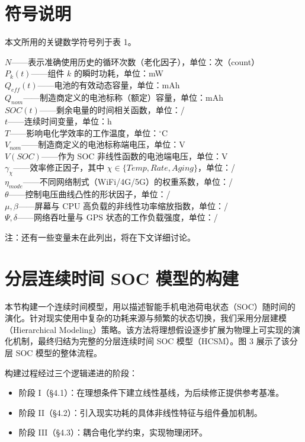 \documentclass[11pt,a4paper]{ctexart}
\begin{document}
\section{符号说明}

本文所用的关键数学符号列于表 1。

\noindent $N$——表示准确使用历史的循环次数（老化因子），单位：次（count）\\
$P_k(t)$——组件 $k$ 的瞬时功耗，单位：mW\\
$Q_{eff}(t)$——电池的有效动态容量，单位：mAh\\
$Q_{nom}$——制造商定义的电池标称（额定）容量，单位：mAh\\
$SOC(t)$——剩余电量的时间相关函数，单位：/\\
$t$——连续时间变量，单位：h\\
$T$——影响电化学效率的工作温度，单位：$^{\circ}$C\\
$V_{nom}$——制造商定义的电池标称端电压，单位：V\\
$V(SOC)$——作为 SOC 非线性函数的电池端电压，单位：V\\
$\gamma_{\chi}$——效率修正因子，其中 $\chi\in\{Temp,Rate,Aging\}$，单位：/\\
$\eta_{mode}$——不同网络制式（WiFi/4G/5G）的权重系数，单位：/\\
$\theta$——控制电压曲线凸性的形状因子，单位：/\\
$\mu,\beta$——屏幕与 CPU 高负载的非线性功率缩放指数，单位：/\\
$\Psi,\delta$——网络吞吐量与 GPS 状态的工作负载强度，单位：/

\noindent*注：还有一些变量未在此列出，将在下文详细讨论。

\section{分层连续时间 SOC 模型的构建}

本节构建一个连续时间模型，用以描述智能手机电池荷电状态（SOC）随时间的演化。针对现实使用中复杂的功耗来源与频繁的状态切换，我们采用分层建模（Hierarchical Modeling）策略。该方法将理想假设逐步扩展为物理上可实现的演化机制，最终归结为完整的分层连续时间 SOC 模型（HCSM）。图 3 展示了该分层 SOC 模型的整体流程。

构建过程经过三个逻辑递进的阶段：

\begin{itemize}[leftmargin=2em]
\item 阶段 I（§4.1）：在理想条件下建立线性基线，为后续修正提供参考基准。
\item 阶段 II（§4.2）：引入现实功耗的具体非线性特征与组件叠加机制。
\item 阶段 III（§4.3）：耦合电化学约束，实现物理闭环。
\end{itemize}
\end{document}
